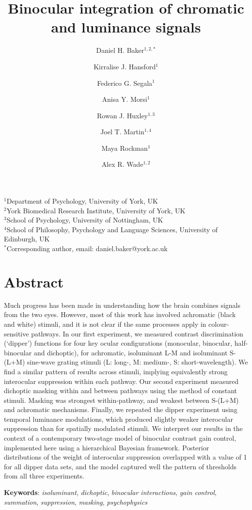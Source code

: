 \documentclass[
  letterpaper,
  DIV=11,
  numbers=noendperiod]{scrartcl}
\title{Binocular integration of chromatic and luminance signals}
\author{Daniel H. Baker\(^{1,2,*}\) \and Kirralise J.
Hansford\(^1\) \and Federico G. Segala\(^1\) \and Anisa Y.
Morsi\(^1\) \and Rowan J. Huxley\(^{1,3}\) \and Joel T.
Martin\(^{1,4}\) \and Maya Rockman\(^1\) \and Alex R. Wade\(^{1,2}\)}
\date{}
\begin{document}
\maketitle

\(^1\)Department of Psychology, University of York, UK\\
\(^2\)York Biomedical Research Institute, University of York, UK\\
\(^3\)School of Psychology, University of Nottingham, UK\\
\(^4\)School of Philosophy, Psychology and Language Sciences, University
of Edinburgh, UK\\
\(^*\)Corresponding author, email: daniel.baker@york.ac.uk

\section{Abstract}\label{abstract}

Much progress has been made in understanding how the brain combines
signals from the two eyes. However, most of this work has involved
achromatic (black and white) stimuli, and it is not clear if the same
processes apply in colour-sensitive pathways. In our first experiment,
we measured contrast discrimination (`dipper') functions for four key
ocular configurations (monocular, binocular, half-binocular and
dichoptic), for achromatic, isoluminant L-M and isoluminant S-(L+M)
sine-wave grating stimuli (L: long-, M: medium-, S: short-wavelength).
We find a similar pattern of results across stimuli, implying
equivalently strong interocular suppression within each pathway. Our
second experiment measured dichoptic masking within and between pathways
using the method of constant stimuli. Masking was strongest
within-pathway, and weakest between S-(L+M) and achromatic mechanisms.
Finally, we repeated the dipper experiment using temporal luminance
modulations, which produced slightly weaker interocular suppression than
for spatially modulated stimuli. We interpret our results in the context
of a contemporary two-stage model of binocular contrast gain control,
implemented here using a hierarchical Bayesian framework. Posterior
distributions of the weight of interocular suppression overlapped with a
value of 1 for all dipper data sets, and the model captured well the
pattern of thresholds from all three experiments.

\textbf{Keywords}: \emph{isoluminant}, \emph{dichoptic}, \emph{binocular
interactions}, \emph{gain control}, \emph{summation},
\emph{suppression}, \emph{masking}, \emph{psychophysics}
\end{document}
